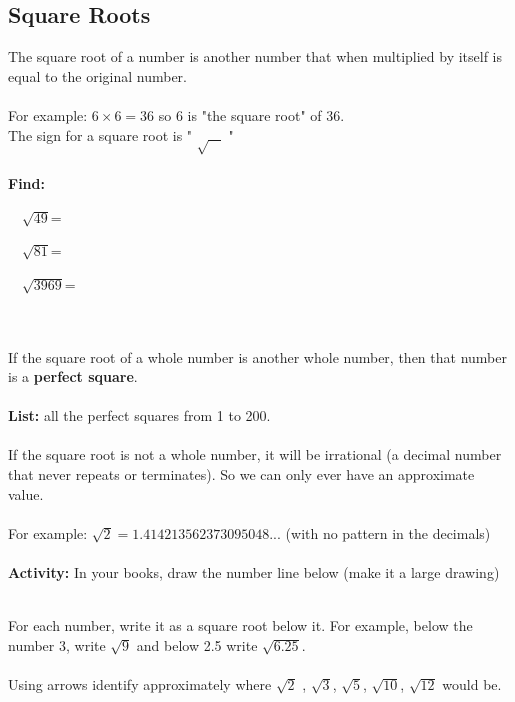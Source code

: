 \documentclass[a4paper,12pt]{article}
\begin{document}
\subsection{Square Roots}
The square root of a number is another number that when multiplied by itself is equal to the original number. \\\\
For example: $6\times6=36$ so 6 is "the square root" of 36. \\
The sign for a square root is " $\sqrt{~~~~}$ "\\\\
\textbf{Find:}
\begin{enumerate*}
	\item ~~$\sqrt{49}$=~~~~~~~~~~~~~~~
	\item ~~$\sqrt{81}$=~~~~~~~~~~~~~~~
		\item ~~$\sqrt{3969}$=~~~~~~~~~~~~~~~
\end{enumerate*}
\\\\If the square root of a whole number is another whole number, then that number is a \textbf{perfect square}.\\\\
\textbf{List:} all the perfect squares from 1 to 200.\\\\
If the square root is not a whole number, it will be irrational (a decimal number that never repeats or terminates). 
So we can only ever have an approximate value.\\\\
For example: $\sqrt{2}=1.414213562373095048...$ (with no pattern in the decimals)\\\\
\textbf{Activity:}
In your books, draw the number line below (make it a large drawing)\\\\
\begin{center}
\end{center}
\vspace{1cm}
For each number, write it as a square root below it. For example, below the number 3, write $\sqrt{9}$ and below 2.5 write $\sqrt{6.25}$.\\\\
Using arrows identify approximately where $\sqrt{2}$ , $\sqrt{3}$, $\sqrt{5}$, $\sqrt{10}$, $\sqrt{12}$ would be.\\
\end{document}
